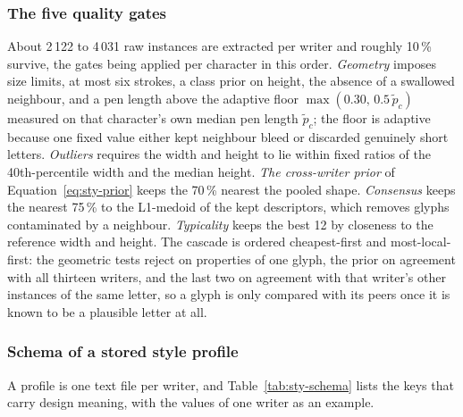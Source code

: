 \subsubsection{The five quality gates}

About 2\,122 to 4\,031 raw instances are extracted per writer and roughly 10\,\% survive, the gates being applied per character in this order.
\emph{Geometry} imposes size limits, at most six strokes, a class prior on height, the absence of a swallowed neighbour, and a pen length above the adaptive floor $\max(0.30,\,0.5\,\tilde p_c)$ measured on that character's own median pen length $\tilde p_c$; the floor is adaptive because one fixed value either kept neighbour bleed or discarded genuinely short letters.
\emph{Outliers} requires the width and height to lie within fixed ratios of the 40th-percentile width and the median height.
\emph{The cross-writer prior} of Equation~\ref{eq:sty-prior} keeps the 70\,\% nearest the pooled shape.
\emph{Consensus} keeps the nearest 75\,\% to the L1-medoid of the kept descriptors, which removes glyphs contaminated by a neighbour.
\emph{Typicality} keeps the best 12 by closeness to the reference width and height.
The cascade is ordered cheapest-first and most-local-first: the geometric tests reject on properties of one glyph, the prior on agreement with all thirteen writers, and the last two on agreement with that writer's other instances of the same letter, so a glyph is only compared with its peers once it is known to be a plausible letter at all.

\subsubsection{Schema of a stored style profile}

A profile is one text file per writer, and Table~\ref{tab:sty-schema} lists the keys that carry design meaning, with the values of one writer as an example.

